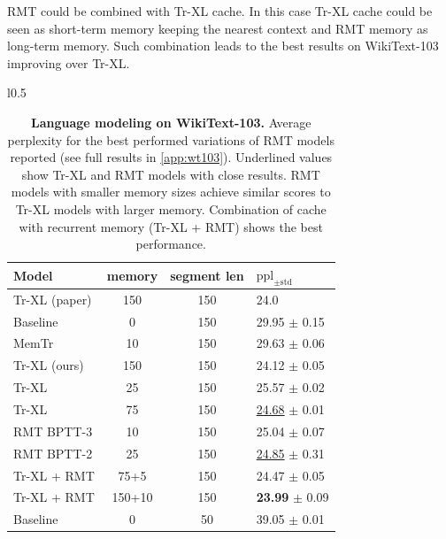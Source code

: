   RMT could be combined with Tr-XL cache. In this case Tr-XL cache could be seen as short-term memory keeping the nearest context and RMT memory as long-term memory. Such combination leads to the best results on WikiText-103 improving over Tr-XL.
  
  \begin{table}{l}{0.5\linewidth}
  \vspace{-0.2in}
  \caption{\small \textbf{Language modeling on WikiText-103.} Average perplexity for the best performed variations of RMT models reported (see full results in \cref{app:wt103}). Underlined values show Tr-XL and RMT models with close results. RMT models with smaller memory sizes achieve similar scores to Tr-XL models with larger memory. Combination of cache with recurrent memory (Tr-XL + RMT) shows the best performance.}
  \label{tab:wt103}
  \begin{center}
  \begin{small}
  \begin{sc}
  \fontsize{7}{8}
  \selectfont 
  \begin{tabular}{lccl}
  \toprule
  Model          & memory & segment len & $\text{ppl}_{\pm \text{std}}$ \\
  \midrule
  Tr-XL (paper)   &  150         &  150        & 24.0  \\
  \midrule
  Baseline        &  0           &  150          & 29.95 \tiny{$\pm$ 0.15} \\
  MemTr           &  10          &  150         & 29.63 \tiny $\pm$ 0.06 \\
  Tr-XL (ours)    &  150         &  150        & 24.12 \tiny $\pm$ 0.05 \\
  \midrule
  Tr-XL           &  25          &  150         & 25.57 \tiny $\pm$ 0.02 \\
  Tr-XL           &  75          &  150         & \underline{24.68} \tiny $\pm$ 0.01 \\
  RMT BPTT-3      &  10          &  150         & 25.04 \tiny $\pm$ 0.07 \\
  RMT BPTT-2      &  25          &  150         & \underline{24.85} \tiny $\pm$ 0.31 \\
  Tr-XL + RMT
  &75+5 &  150        &  24.47 \tiny $\pm$ 0.05 \\
  Tr-XL + RMT
  &150+10&  150        & \textbf{23.99} \tiny $\pm$ 0.09 \\
  \midrule
  Baseline        &   0          &  50          & 39.05 \tiny $\pm$ 0.01 \\

\end{tabular}
\end{sc}
\end{small}
\end{center}
\end{table}
